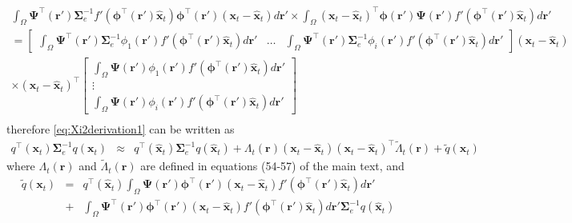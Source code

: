 \documentclass[]{article}
\begin{document}
\begin{eqnarray}
 \int_\Omega \boldsymbol{\Psi}^\top(\mathbf{r}') \boldsymbol\Sigma_e^{-1}f'(\boldsymbol \phi^\top(\mathbf r')\mathbf {\hat x}_t) \boldsymbol \phi^\top(\mathbf r')(\mathbf x_t - \mathbf  {\hat x}_t)d\mathbf{r}' \times\int_\Omega  (\mathbf x_t - \mathbf  {\hat x}_t)^\top\boldsymbol \phi(\mathbf r') \boldsymbol{\Psi}(\mathbf{r}')f'(\boldsymbol \phi^\top(\mathbf r')\mathbf {\hat x}_t) d\mathbf{r}'&& \nonumber \\
=\begin{bmatrix} \int_{\Omega} \boldsymbol \Psi^\top(\mathbf r')\boldsymbol \Sigma_e^{-1}\phi_1(\mathbf r')f'(\boldsymbol\phi^\top(\mathbf r')\mathbf {\hat x}_t)d\mathbf r' &  \dots & \int_{\Omega} \boldsymbol \Psi^\top(\mathbf r')\boldsymbol \Sigma_e^{-1}\phi_i(\mathbf r')f'(\boldsymbol\phi^\top(\mathbf r')\mathbf {\hat x}_t)d\mathbf r'\end{bmatrix}(\mathbf x_t - \mathbf  {\hat x}_t) && \nonumber \\
\times (\mathbf x_t - \mathbf  {\hat x}_t)^\top \begin{bmatrix}\int_{\Omega} \boldsymbol \Psi(\mathbf r')\phi_1(\mathbf r')f'(\boldsymbol\phi^\top(\mathbf r')\mathbf {\hat x}_t)d\mathbf r' \\  \vdots \\ \int_{\Omega} \boldsymbol \Psi(\mathbf r')\phi_i(\mathbf r')f'(\boldsymbol\phi^\top(\mathbf r')\mathbf {\hat x}_t)d\mathbf r'\end{bmatrix}&& \nonumber \\
\end{eqnarray}
therefore \ref{eq:Xi2derivation1} can be written as
\begin{eqnarray}\label{eq:Xi2derivation2}
  q^\top(\mathbf x_t)\boldsymbol\Sigma_e^{-1}q(\mathbf x_t)&\approx&q^\top(\mathbf {\hat x}_t)\boldsymbol\Sigma_e^{-1}q(\mathbf {\hat x}_t)+\Lambda_t(\mathbf r)(\mathbf x_t - \mathbf  {\hat x}_t) (\mathbf x_t - \mathbf  {\hat x}_t)^\top\tilde{\Lambda}_t(\mathbf r)+\tilde{q}(\mathbf x_t)
\end{eqnarray}
where $\Lambda_t(\mathbf r)$ and $\tilde{\Lambda}_t(\mathbf r)$ are defined in equations (54-57) of the main text, and  
\begin{eqnarray}\label{eq:qtilde}
 \tilde{q}(\mathbf x_t)&=&q^\top(\mathbf {\hat x}_t)\int_\Omega \boldsymbol{\Psi}(\mathbf{r}')\boldsymbol \phi^\top(\mathbf r') (\mathbf x_t - \mathbf  {\hat x}_t)f'(\boldsymbol \phi^\top(\mathbf r')\mathbf {\hat x}_t) d\mathbf{r}'\nonumber\\
&+&\int_\Omega \boldsymbol{\Psi}^\top(\mathbf{r}')\boldsymbol \phi^\top(\mathbf r') (\mathbf x_t - \mathbf  {\hat x}_t)f'(\boldsymbol \phi^\top(\mathbf r')\mathbf {\hat x}_t) d\mathbf{r}'\boldsymbol\Sigma_e^{-1}q(\mathbf {\hat x}_t)
\end{eqnarray}
\end{document}
